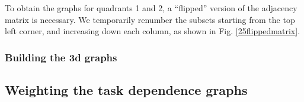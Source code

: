 To obtain the graphs for quadrants 1 and 2, a ``flipped'' version of the adjacency matrix is necessary. 
We temporarily renumber the subsets starting from the top left corner, and increasing down each column, as shown in Fig. \ref{25flippedmatrix}.
\begin{figure}

\end{figure}

\subsubsection{Building the 3d graphs}


\subsection{Weighting the task dependence graphs}


